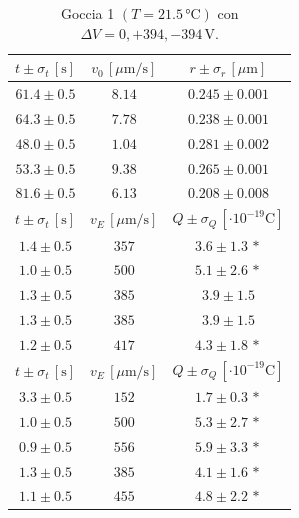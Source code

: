 \documentclass[]{article}
\begin{document}
    \begin{table}[H]
        \centering
        \begin{tabular}{||c|c|c||}
            \hline
            $t \pm \sigma_t \, \left[\text{s}\right]$ & $v_0 \, \left[\mu\text{m/s}\right]$ & $r \pm \sigma_r \, \left[\mu\text{m}\right]$ \\\hline
            \hline
            $61.4 \pm 0.5$ & $8.14$ & $0.245 \pm 0.001$ \\\hline
            $64.3 \pm 0.5$ & $7.78$ & $0.238 \pm 0.001$ \\\hline
            $48.0 \pm 0.5$ & $1.04$ & $0.281 \pm 0.002$ \\\hline
            $53.3 \pm 0.5$ & $9.38$ & $0.265 \pm 0.001$ \\\hline
            $81.6 \pm 0.5$ & $6.13$ & $0.208 \pm 0.008$ \\\hline
            \hline
            $t \pm \sigma_t \, \left[\text{s}\right]$ & $v_E \, \left[\mu\text{m/s}\right]$ & $Q \pm \sigma_Q \, \left[\cdot 10^{-19} \text{C}\right]$ \\\hline
            \hline
            $1.4 \pm 0.5$ & $357$ & $3.6 \pm 1.3\,\ast$ \\\hline
            $1.0 \pm 0.5$ & $500$ & $5.1 \pm 2.6\,\ast$ \\\hline
            $1.3 \pm 0.5$ & $385$ & $3.9 \pm 1.5$ \\\hline
            $1.3 \pm 0.5$ & $385$ & $3.9 \pm 1.5$ \\\hline
            $1.2 \pm 0.5$ & $417$ & $4.3 \pm 1.8\,\ast$ \\\hline
            \hline
            $t \pm \sigma_t \, \left[\text{s}\right]$ & $v_E \, \left[\mu\text{m/s}\right]$ & $Q \pm \sigma_Q \, \left[\cdot 10^{-19} \text{C}\right]$ \\\hline
            \hline
            $3.3 \pm 0.5$ & $152$ & $1.7 \pm 0.3\,\ast$ \\\hline
            $1.0 \pm 0.5$ & $500$ & $5.3 \pm 2.7\,\ast$ \\\hline
            $0.9 \pm 0.5$ & $556$ & $5.9 \pm 3.3\,\ast$ \\\hline
            $1.3 \pm 0.5$ & $385$ & $4.1 \pm 1.6\,\ast$ \\\hline
            $1.1 \pm 0.5$ & $455$ & $4.8 \pm 2.2\,\ast$ \\\hline
        \end{tabular}
        \caption{Goccia 1 $\left(T = 21.5\, \text{°C}\right)$ con $\Delta V = 0,+394,-394 \,\text{V}$.}
        \label{goccia-1}
    \end{table}
\end{document}
